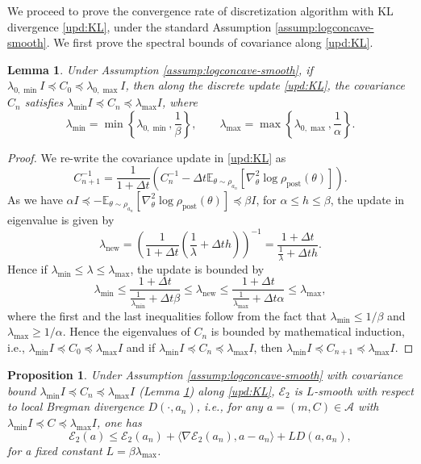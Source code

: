 \documentclass[11pt]{article}
\theoremstyle{plain}
\newtheorem{proposition}[theorem]{Proposition}
\newtheorem{lemma}[theorem]{Lemma}
\theoremstyle{definition}
\theoremstyle{remark}
\begin{document}
We proceed to prove the convergence rate of discretization algorithm with KL divergence \eqref{upd:KL}, under the standard Assumption \ref{assump:logconcave-smooth}. We first prove the spectral bounds of covariance along \eqref{upd:KL}.

\begin{lemma}\label{lem:cov-bound-kl}
    Under Assumption \ref{assump:logconcave-smooth}, if $\lambda_{0, \min} I \preceq C_0 \preceq \lambda_{0, \max} I$, then along the discrete update \eqref{upd:KL}, the covariance $C_n$ satisfies $\lambda_{\min} I \preceq C_n \preceq \lambda_{\max} I$, where 
    \begin{equation*}
        \lambda_{\min} = \min\left\{\lambda_{0, \min}, \frac{1}{\beta}\right\}, \qquad \lambda_{\max} = \max\left\{ \lambda_{0, \max}, \frac{1}{\alpha} \right\}.
    \end{equation*}
\end{lemma}

\begin{proof}
We re-write the covariance update in \eqref{upd:KL} as 
\[ C_{n+1}^{-1} = \frac{1}{1 + \Delta t} (C_n^{-1} - \Delta t \mathbb{E}_{\theta \sim \rho_{a_n}} [\nabla_\theta^2 \log \rho_\mathrm{post}(\theta)]).\]
As we have $\alpha I \preceq -\mathbb{E}_{\theta \sim \rho_{a_n}} [\nabla_\theta^2 \log \rho_\mathrm{post}(\theta)] \preceq \beta I$, for $\alpha \leq h \leq \beta$, the update in eigenvalue is given by
\[\lambda_{\mathrm{new}} = \left(\frac{1}{1 + \Delta t} \left(\frac{1}{\lambda} + \Delta t h\right)\right)^{-1} = \frac{1 + \Delta t}{\frac{1}{\lambda} + \Delta t h}.\]
Hence if $\lambda_{\min} \leq \lambda \leq \lambda_{\max}$, the update is bounded by
\begin{equation*}
     \lambda_{\min} \leq \frac{1 + \Delta t}{\frac{1}{\lambda_{\min}} + \Delta t \beta} \leq \lambda_{\mathrm{new}} \leq \frac{1 + \Delta t}{\frac{1}{\lambda_{\max}} + \Delta t \alpha} \leq \lambda_{\max},
\end{equation*}
where the first and the last inequalities follow from the fact that $\lambda_{\min} \leq 1/\beta$ and $\lambda_{\max} \geq 1/\alpha$. Hence the eigenvalues of $C_n$ is bounded by mathematical induction, i.e., $\lambda_{\min} I \preceq C_0 \preceq \lambda_{\max} I$ and if $\lambda_{\min} I \preceq C_n \preceq \lambda_{\max} I$, then $\lambda_{\min} I \preceq C_{n+1} \preceq \lambda_{\max} I$.
\end{proof}

\begin{proposition}\label{prop:conv-smooth-D}
    Under Assumption \ref{assump:logconcave-smooth} with covariance bound $\lambda_{\min} I \preceq C_n \preceq \lambda_{\max} I$ (Lemma \ref{lem:cov-bound-kl}) along \eqref{upd:KL}, $\mathcal{E}_2$ is $L$-smooth with respect to local Bregman divergence $D(\cdot, a_n)$, i.e., for any $a = (m, C) \in \mathcal{A}$ with $\lambda_{\min} I \preceq C \preceq \lambda_{\max} I$, one has
    \begin{equation*}
        \mathcal{E}_2 (a) \leq \mathcal{E}_2 (a_n) + \langle \nabla \mathcal{E}_2 (a_n), a - a_n \rangle + L D (a, a_n),
    \end{equation*}
    for a fixed constant $L = \beta  \lambda_{\max}$.
\end{proposition}
\end{document}
